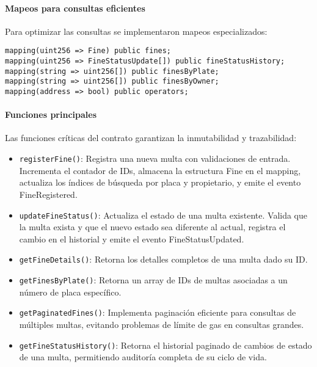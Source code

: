 \paragraph{Mapeos para consultas eficientes}
Para optimizar las consultas se implementaron mapeos especializados:

\begin{verbatim}
mapping(uint256 => Fine) public fines;
mapping(uint256 => FineStatusUpdate[]) public fineStatusHistory;
mapping(string => uint256[]) public finesByPlate;
mapping(string => uint256[]) public finesByOwner;
mapping(address => bool) public operators;
\end{verbatim}

\paragraph{Funciones principales}
Las funciones críticas del contrato garantizan la inmutabilidad y trazabilidad:

\begin{itemize}
    \item \texttt{registerFine()}: Registra una nueva multa con validaciones de entrada. Incrementa el contador de IDs, almacena la estructura Fine en el mapping, actualiza los índices de búsqueda por placa y propietario, y emite el evento FineRegistered.
    
    \item \texttt{updateFineStatus()}: Actualiza el estado de una multa existente. Valida que la multa exista y que el nuevo estado sea diferente al actual, registra el cambio en el historial y emite el evento FineStatusUpdated.
    
    \item \texttt{getFineDetails()}: Retorna los detalles completos de una multa dado su ID.
    
    \item \texttt{getFinesByPlate()}: Retorna un array de IDs de multas asociadas a un número de placa específico.
    
    \item \texttt{getPaginatedFines()}: Implementa paginación eficiente para consultas de múltiples multas, evitando problemas de límite de gas en consultas grandes.
    
    \item \texttt{getFineStatusHistory()}: Retorna el historial paginado de cambios de estado de una multa, permitiendo auditoría completa de su ciclo de vida.
\end{itemize}

